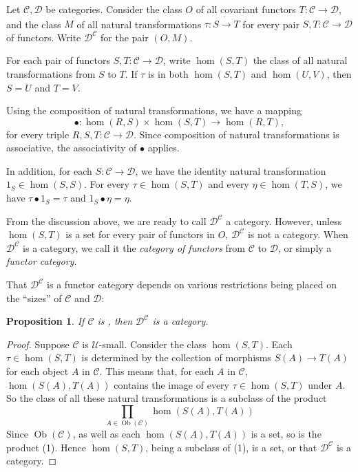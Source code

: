 \documentclass[12pt]{article}
\newtheorem{prop}{Proposition}
\begin{document}

Let $\mathcal{C},\mathcal{D}$ be categories.  Consider the class $O$ of all covariant functors $T:\mathcal{C}\to \mathcal{D}$, and the class $M$ of all natural transformations $\tau:S\dot{\to} T$ for every pair $S,T:\mathcal{C}\to \mathcal{D}$ of functors.  Write $\mathcal{D}^\mathcal{C}$ for the pair $(O,M)$.

For each pair of functors $S,T:\mathcal{C}\to \mathcal{D}$, write $\hom(S,T)$ the class of all natural transformations from $S$ to $T$.  If $\tau$ is in both $\hom(S,T)$ and $\hom(U,V)$, then $S=U$ and $T=V$.

Using the composition of natural transformations, we have a mapping $$\bullet:\hom(R,S)\times \hom(S,T)\to \hom(R,T),$$ for every triple $R,S,T:\mathcal{C}\to \mathcal{D}$.  Since composition of natural transformations is associative, the associativity of $\bullet$ applies.

In addition, for each $S:\mathcal{C}\to \mathcal{D}$, we have the identity natural transformation $1_S\in \hom(S,S)$.  For every $\tau\in \hom(S,T)$ and every $\eta\in \hom(T,S)$, we have $\tau \bullet 1_S=\tau$ and $1_S\bullet \eta=\eta$. 

From the discussion above, we are ready to call $\mathcal{D}^\mathcal{C}$ a category.  However, unless $\hom(S,T)$ is a set for every pair of functors in $O$, $\mathcal{D}^\mathcal{C}$ is not a category.  When $\mathcal{D}^\mathcal{C}$ is a category, we call it the \emph{category of functors} from $\mathcal{C}$ to $\mathcal{D}$, or simply a \emph{functor category}.

That $\mathcal{D}^\mathcal{C}$ is a functor category depends on various restrictions being placed on the ``sizes'' of $\mathcal{C}$ and $\mathcal{D}$:

\begin{prop} If $\mathcal{C}$ is , then $\mathcal{D}^\mathcal{C}$ is a category. \end{prop}
\begin{proof}  Suppose $\mathcal{C}$ is $\mathcal{U}$-small.  Consider the class $\hom(S,T)$.  Each $\tau \in \hom(S,T)$ is determined by the collection of morphisms $S(A)\to T(A)$ for each object $A$ in $\mathcal{C}$.  This means that, for each $A$ in $\mathcal{C}$, $\hom(S(A),T(A))$ contains the image of every $\tau\in \hom(S,T)$ under $A$.  So the class of all these natural transformations is a subclass of the product 
\begin{equation}
\prod_{A\in \operatorname{Ob}(\mathcal{C})} \hom(S(A),T(A))
\end{equation}
Since $\operatorname{Ob}(\mathcal{C})$, as well as each $\hom(S(A),T(A))$ is a set, so is the product (1).  Hence $\hom(S,T)$, being a subclass of (1), is a set, or that $\mathcal{D}^{\mathcal{C}}$ is a category.
\end{proof}
\end{document}
